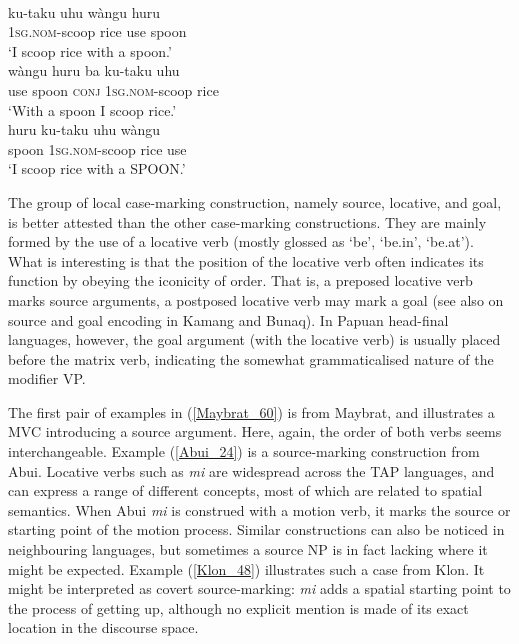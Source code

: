 \ea 
{}\\
\ea \label{Kambera_22a}
\gll ku-taku uhu wàngu huru \\
1\textsc{sg}.\textsc{nom}-scoop rice use spoon \\
\glft `I scoop rice with a spoon.' \\ 
\ex \label{Kambera_22b}
\gll wàngu huru ba ku-taku uhu \\
use spoon \textsc{conj} 1\textsc{sg}.\textsc{nom}-scoop rice \\
\glft `With a spoon I scoop rice.' \\ 
\ex \label{Kambera_22c}
\gll huru ku-taku uhu wàngu \\ 
spoon 1\textsc{sg}.\textsc{nom}-scoop rice use \\
\glft `I scoop rice with a SPOON.'\\ 
\z
\z

The group of local case-marking construction, namely source, locative, and goal, is better attested than the other case-marking constructions. They are mainly formed by the use of a locative verb (mostly glossed as `be', `be.in', `be.at'). What is interesting is that the position of the locative verb often indicates its function by obeying the iconicity of order. That is, a preposed locative verb marks source arguments, a postposed locative verb may mark a goal (see also \citealt{schapper2011iconicity} on source and goal encoding in Kamang and Bunaq). In Papuan head-final languages, however, the goal argument (with the locative verb) is usually placed before the matrix verb, indicating the somewhat grammaticalised nature of the modifier VP.

The first pair of examples in (\ref{Maybrat_60}) is from Maybrat, and illustrates a MVC introducing a source argument. Here, again, the order of both verbs seems interchangeable. Example (\ref{Abui_24}) is a source-marking construction from Abui. Locative verbs such as \textit{mi} are widespread across the TAP languages, and can express a range of different concepts, most of which are related to spatial semantics. When Abui \textit{mi} is construed with a motion verb, it marks the source or starting point of the motion process. Similar constructions can also be noticed in neighbouring languages, but sometimes a source NP is in fact lacking where it might be expected. Example (\ref{Klon_48}) illustrates such a case from Klon. It might be interpreted as covert source-marking: \textit{mi} adds a spatial starting point to the process of getting up, although no explicit mention is made of its exact location in the discourse space.

